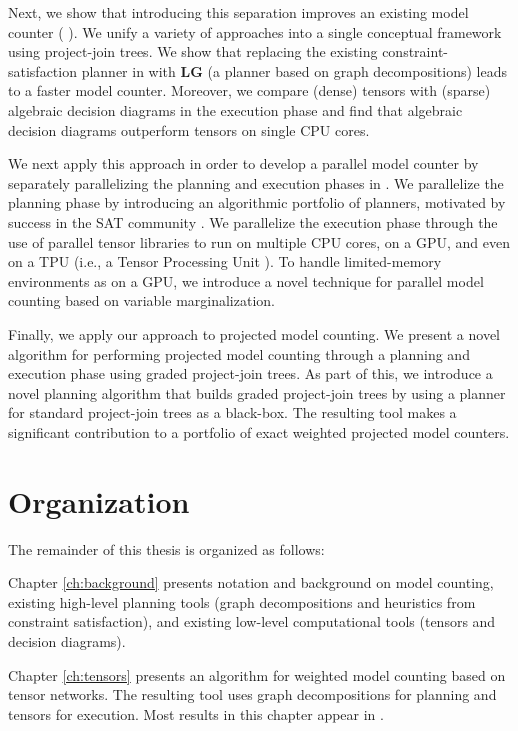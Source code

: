 Next, we show that introducing this separation improves an existing model counter ( \cite{DPV20,phan2019weighted}). We unify a variety of approaches into a single conceptual framework using project-join trees. We show that replacing the existing constraint-satisfaction planner in  with \textbf{LG} (a planner based on graph decompositions) leads to a faster model counter. Moreover, we compare (dense) tensors with (sparse) algebraic decision diagrams in the execution phase and find that algebraic decision diagrams outperform tensors on single CPU cores.

We next apply this approach in order to develop a parallel model counter by separately parallelizing the planning and execution phases in . We parallelize the planning phase by introducing an algorithmic portfolio of planners, motivated by success in the SAT community \cite{XHHL08}. We parallelize the execution phase through the use of parallel tensor libraries to run on multiple CPU cores, on a GPU, and even on a TPU (i.e., a Tensor Processing Unit \cite{JYPPABBBBB17}). To handle limited-memory environments as on a GPU, we introduce a novel technique for parallel model counting based on variable marginalization.

Finally, we apply our approach to projected model counting. We present a novel algorithm for performing projected model counting through a planning and execution phase using graded project-join trees. As part of this, we introduce a novel planning algorithm that builds graded project-join trees by using a planner for standard project-join trees as a black-box. The resulting tool  makes a significant contribution to a portfolio of exact weighted projected model counters.

\section{Organization}
The remainder of this thesis is organized as follows:

Chapter \ref{ch:background} presents notation and background on model counting, existing high-level planning tools (graph decompositions and heuristics from constraint satisfaction), and existing low-level computational tools (tensors and decision diagrams). 

Chapter \ref{ch:tensors} presents an algorithm for weighted model counting based on tensor networks. The resulting tool  uses graph decompositions for planning and tensors for execution. Most results in this chapter appear in \cite{DDV19}.

